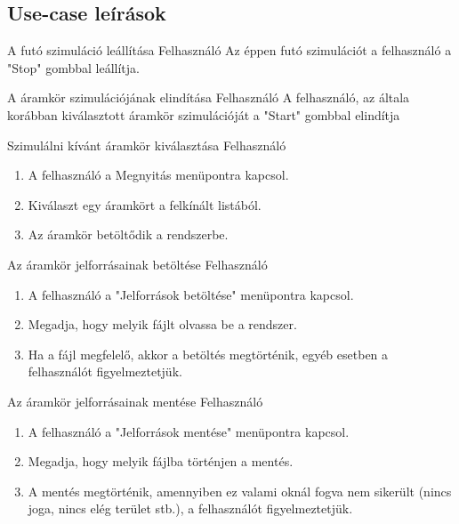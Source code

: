 \subsection{Use-case leírások}

{A futó szimuláció leállítása}
{Felhasználó}
{Az éppen futó szimulációt a felhasználó a "Stop" gombbal leállítja.}

{A áramkör szimulációjának elindítása}
{Felhasználó}
{A felhasználó, az általa korábban kiválasztott áramkör szimulációját a "Start" gombbal elindítja}

{Szimulálni kívánt áramkör kiválasztása}
{Felhasználó}
{\vspace{-20pt}\begin{enumerate}
\setlength{\itemsep}{0cm}%
\setlength{\parskip}{0cm}%
\item A felhasználó a Megnyitás menüpontra kapcsol.
\item Kiválaszt egy áramkört a felkínált listából.
\item Az áramkör betöltődik a rendszerbe.
\end{enumerate}\vspace{-20pt}}

{Az áramkör jelforrásainak betöltése}
{Felhasználó}
{\vspace{-20pt}\begin{enumerate}
\setlength{\itemsep}{0cm}%
\setlength{\parskip}{0cm}%
\item A felhasználó a "Jelforrások betöltése" menüpontra kapcsol.
\item Megadja, hogy melyik fájlt olvassa be a rendszer.
\item Ha a fájl megfelelő, akkor a betöltés megtörténik, egyéb esetben a felhasználót figyelmeztetjük.
\end{enumerate}\vspace{-20pt}}

{Az áramkör jelforrásainak mentése}
{Felhasználó}
{\vspace{-20pt}\begin{enumerate}
\setlength{\itemsep}{0cm}%
\setlength{\parskip}{0cm}%
\item A felhasználó a "Jelforrások mentése" menüpontra kapcsol.
\item Megadja, hogy melyik fájlba történjen a mentés.
\item A mentés megtörténik, amennyiben ez valami oknál fogva nem sikerült (nincs joga, nincs elég terület stb.), a felhasználót figyelmeztetjük.
\end{enumerate}\vspace{-20pt}}

